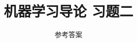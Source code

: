 \documentclass[a4paper]{article}
\numberwithin{equation}{section}
\theoremstyle{definition}
\begin{document}
\title{机器学习导论 习题二}
\author{参考答案}
\maketitle


\end{document}
